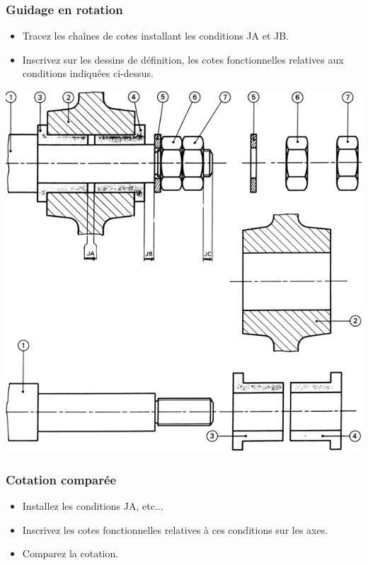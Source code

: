 \documentclass[11pt,oneside]{article}
\begin{document}
\newpage

\subsubsection{Guidage en rotation}
\begin{itemize}
\item Tracez les chaînes de cotes installant les conditions JA et JB.
\item Inscrivez sur les dessins de définition, les cotes fonctionnelles relatives aux conditions indiquées ci-dessus.
\end{itemize}
 

\begin{center}
\includegraphics[width=.8\textwidth]{png/guidage}
\end{center}
 
\newpage

\subsubsection{Cotation comparée}
\begin{itemize}
\item Installez les conditions JA, etc...
\item Inscrivez les cotes fonctionnelles relatives à ces conditions sur les axes.
\item Comparez la cotation.
\end{itemize}
\end{document}
